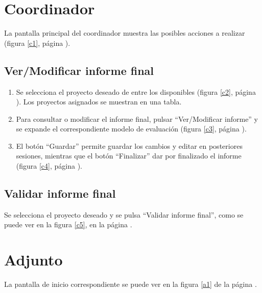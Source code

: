 \documentclass[11pt,a4paper,spanish,twoside]{book}
\begin{document}
\section{Coordinador}
La pantalla principal del coordinador muestra las posibles acciones a realizar 
(figura \ref{c1}, página \pageref{c1}).

\subsection{Ver/Modificar informe final}
\begin{enumerate}
\item Se selecciona el proyecto deseado de entre los disponibles (figura 
  \ref{c2}, página \pageref{c2}). Los proyectos asignados se muestran en una
  tabla.
  

\item Para consultar o modificar el informe final, pulsar 
  ``Ver/Modificar informe'' y se expande el correspondiente modelo de 
  evaluación (figura \ref{c3}, página \pageref{c3}).


\item El botón ``Guardar'' permite guardar los cambios y editar en 
  posteriores sesiones, mientras que el botón ``Finalizar'' dar por finalizado 
  el informe (figura \ref{c4}, página \pageref{c4}).
  
\end{enumerate}

\subsection{Validar informe final}
Se selecciona el proyecto deseado y se pulsa ``Validar informe final'', como se 
puede ver en la figura \ref{c5}, en la página \pageref{c5}.

\section{Adjunto}
La pantalla de inicio correspondiente se puede ver en la figura \ref{a1} de
la página \pageref{a1}.
\end{document}
